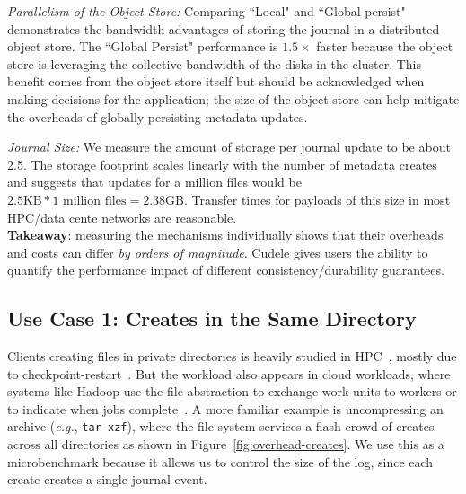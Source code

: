 {\it Parallelism of the Object Store:} Comparing ``Local" and ``Global
persist" demonstrates the bandwidth advantages of storing the journal in a
distributed object store. The ``Global Persist"
performance is \(1.5\times\) faster because the object store is leveraging the
collective bandwidth of the disks in the cluster. This benefit comes from the
object store itself but should be acknowledged when making decisions for the
application; the size of the object store can help mitigate the overheads of
globally persisting metadata updates.

{\it Journal Size:} We measure the amount of storage per journal update to be
about 2.5. The storage footprint scales linearly with the number of
metadata creates and suggests that updates for a million files would be
\(2.5\text{KB}*1\text{ million files} = 2.38\text{GB}\). Transfer times for
payloads of this size in most HPC/data cente networks are reasonable.\\

\noindent\textbf{Takeaway}: measuring the mechanisms individually shows that
their overheads and costs can differ {\it by orders of magnitude}. Cudele gives
users the ability to quantify the performance impact of different
consistency/durability guarantees.\\

\subsection{Use Case 1: Creates in the Same Directory}
\label{sec:use-case-1}

Clients creating files in private directories is heavily studied in
HPC~\cite{weil:sc2004-dyn-metadata, ren:sc2014-indexfs, patil:fast2011-giga,
zheng:pdsw2014-batchfs, sevilla:sc15-mantle}, mostly due to
checkpoint-restart~\cite{bent_plfs_2009}.  But the workload also appears in
cloud workloads, where systems like Hadoop use the file abstraction to exchange
work units to workers or to indicate when jobs
complete~\cite{shvachko:login2012-hdfs-scalability}. A more familiar example is
uncompressing an archive ({\it e.g.}, \texttt{tar xzf}), where the file system
services a flash crowd of creates across all directories as shown in
Figure~\ref{fig:overhead-creates}.  We use this as a microbenchmark because it
allows us to control the size of the log, since each create creates a single
journal event.



